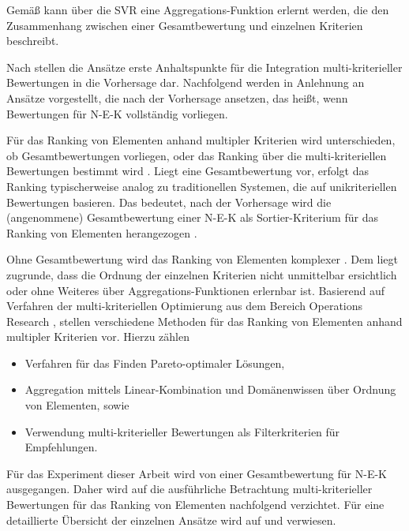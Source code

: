 Gemäß \textcite[S. 675]{jannach:2:article} kann über die \ac{SVR} eine Aggregations-Funktion erlernt werden, die den Zusammenhang zwischen einer Gesamtbewertung und einzelnen Kriterien beschreibt. 

Nach \textcite[S. 866]{adomavicius:4:inbook} stellen die Ansätze erste Anhaltspunkte für die Integration multi-kriterieller Bewertungen in die Vorhersage dar.
Nachfolgend werden in Anlehnung an \textcite[S. 867]{adomavicius:4:inbook} Ansätze vorgestellt, die nach der Vorhersage ansetzen, das heißt, wenn Bewertungen für \ac{N-E-K} vollständig vorliegen.


Für das Ranking von Elementen anhand multipler Kriterien wird unterschieden, ob Gesamtbewertungen vorliegen, oder das Ranking über die multi-kriteriellen Bewertungen bestimmt wird \cite[S. 867]{adomavicius:4:inbook}.
Liegt eine Gesamtbewertung vor, erfolgt das Ranking typischerweise analog zu traditionellen Systemen, die auf unikriteriellen Bewertungen basieren.
Das bedeutet, nach der Vorhersage wird die (angenommene) Gesamtbewertung einer \ac{N-E-K} als Sortier-Kriterium für das Ranking von Elementen herangezogen \cite[S. 867]{adomavicius:4:inbook}.

Ohne Gesamtbewertung wird das Ranking von Elementen komplexer \cite[S. 867]{adomavicius:4:inbook}.
Dem liegt zugrunde, dass die Ordnung der einzelnen Kriterien nicht unmittelbar ersichtlich \cite[S. 867]{adomavicius:4:inbook} oder ohne Weiteres über Aggregations-Funktionen erlernbar ist.
Basierend auf Verfahren der multi-kriteriellen Optimierung aus dem Bereich Operations Research \cite[S. 745]{adomavicius:inproceedings}, stellen \textcite[S. 867]{adomavicius:4:inbook} verschiedene Methoden für das Ranking von Elementen anhand multipler Kriterien vor.
Hierzu zählen
\begin{itemize}
    \item Verfahren für das Finden Pareto-optimaler Lösungen,
    \item Aggregation mittels Linear-Kombination und Domänenwissen über Ordnung von Elementen, sowie
    \item Verwendung multi-kriterieller Bewertungen als Filterkriterien für Empfehlungen.
\end{itemize}

Für das Experiment dieser Arbeit wird von einer Gesamtbewertung für \ac{N-E-K} ausgegangen.
Daher wird auf die ausführliche Betrachtung multi-kriterieller Bewertungen für das Ranking von Elementen nachfolgend verzichtet.
Für eine detaillierte Übersicht der einzelnen Ansätze wird auf \textcite[S. 745]{adomavicius:inproceedings} und \textcite[S. 868ff.]{adomavicius:4:inbook} verwiesen.

